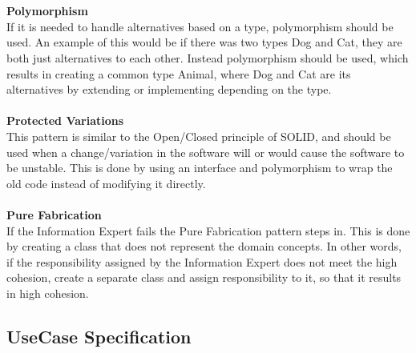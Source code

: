 \\
\\
\textbf{Polymorphism}
\\
If it is needed to handle alternatives based on a type, polymorphism should be used. An example of this would be if there was two types Dog and Cat, they are both just alternatives to each other. Instead polymorphism should be used, which results in creating a common type Animal, where Dog and Cat are its alternatives by extending or implementing depending on the type.
\\
\\
\textbf{Protected Variations}
\\
This pattern is similar to the Open/Closed principle of SOLID, and should be used when
a change/variation in the software will or would cause the software to be unstable. This is done by using an interface and polymorphism to wrap the old code instead of modifying it directly.
\\
\\
\textbf{Pure Fabrication}
\\
If the Information Expert fails the Pure Fabrication pattern steps in. This is done by creating a class that does not represent the domain concepts. In other words, if the responsibility assigned by the Information Expert does not meet the high cohesion, create a separate class and assign responsibility to it, so that it results in high cohesion.



\subsection {UseCase Specification}
\label{appendix:useCase_specification}



